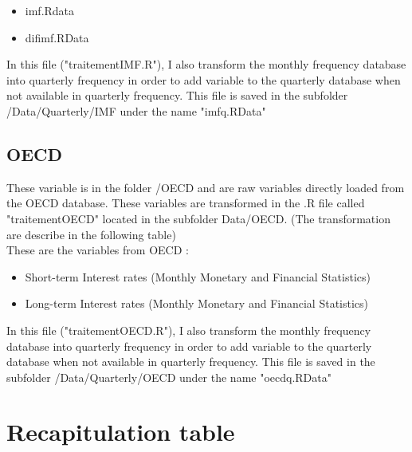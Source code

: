 \documentclass[11pt,a4paper]{article}
\begin{document}
\begin{itemize}
\item imf.Rdata 
\item difimf.RData 
\end{itemize}

\vspace{0.5cm}

In this file ("traitementIMF.R"), I also transform the monthly frequency database into quarterly  frequency in order to add variable to the quarterly database when not available in quarterly frequency. This file is saved in the subfolder /Data/Quarterly/IMF under the name "imfq.RData" 






\subsection{OECD}

These variable is in the folder /OECD and are raw variables directly loaded from the OECD database.  These variables are transformed in the .R file called "traitementOECD" located in the subfolder Data/OECD. (The transformation are describe in the following table) \\


These are the variables from OECD :
\begin{itemize}
\item Short-term Interest rates (Monthly Monetary and Financial Statistics)
\item Long-term Interest rates (Monthly Monetary and Financial Statistics)
\end{itemize}

\vspace{0.5cm}

In this file ("traitementOECD.R"), I also transform the monthly frequency database into quarterly  frequency in order to add variable to the quarterly database when not available in quarterly frequency. This file is saved in the subfolder /Data/Quarterly/OECD under the name "oecdq.RData" 




\section{Recapitulation table}
\end{document}
